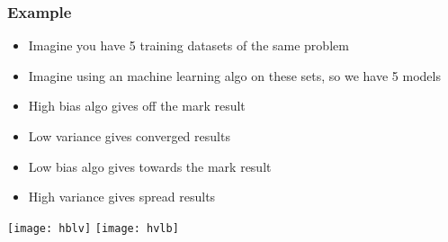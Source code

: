 \begin{frame}[fragile]\frametitle{Example }

\begin{itemize}
\item Imagine you have 5 training datasets of the same problem
\item Imagine using an machine learning algo on these sets, so we have 5 models
\item High bias algo gives off the mark result
\item Low variance gives converged results
\item Low bias algo gives towards the mark result
\item High variance gives spread results
\end{itemize}
\begin{center}
\texttt{[image: hblv]}
\texttt{[image: hvlb]}
\end{center}

\end{frame}



